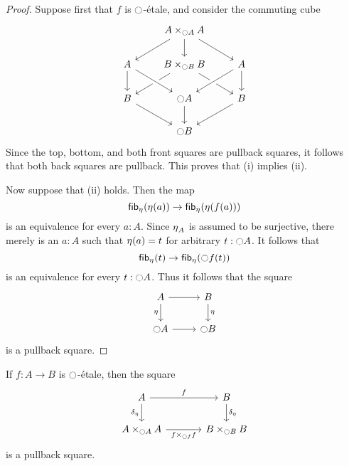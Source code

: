 \documentclass[9pt,twosided]{amsart}
\begin{document}
\begin{proof}
Suppose first that $f$ is ${\ocircle}$-\'etale, and consider the commuting cube
\begin{equation*}
\begin{tikzcd}
& A\times_{\modal A} A \arrow[dl] \arrow[d] \arrow[dr] \\
A \arrow[d] & B\times_{\modal B} B \arrow[dl] \arrow[dr] & A \arrow[dl,crossing over] \arrow[d] \\
B \arrow[dr] & \modal A \arrow[from=ul,crossing over] \arrow[d] & B \arrow[dl] \\
& \modal B
\end{tikzcd}
\end{equation*}
Since the top, bottom, and both front squares are pullback squares, it follows that both back squares are pullback. This proves that (i) implies (ii).

Now suppose that (ii) holds. Then the map
\begin{equation*}
\fib{\modalunit}{\modalunit(a)}\to \fib{\modalunit}{\modalunit(f(a))}
\end{equation*}
is an equivalence for every $a:A$. Since ${\eta_{}}_A$ is assumed to be surjective, there merely is an $a:A$ such that ${\eta_{}}(a)=t$ for arbitrary $t:{\ocircle} A$.
It follows that
\begin{equation*}
\fib{\modalunit}{t}\to \fib{\modalunit}{\modal f(t)}
\end{equation*}
is an equivalence for every $t:{\ocircle} A$. Thus it follows that the square
\begin{equation*}
\begin{tikzcd}
A \arrow[d,swap,"\modalunit"] \arrow[r] & B \arrow[d,"\modalunit"] \\
\modal A \arrow[r] & \modal B
\end{tikzcd}
\end{equation*}
is a pullback square.
\end{proof}

\begin{cor}
If $f:A\to B$ is ${\ocircle}$-\'etale, then the square
\begin{equation*}
\begin{tikzcd}[column sep=large]
A \arrow[d,swap,"\delta_{\modalunit}"] \arrow[r,"f"] & B \arrow[d,"\delta_{\modalunit}"] \\
A\times_{\modal A} A \arrow[r,swap,"f\times_{\modal f}f"] & B\times_{\modal B} B
\end{tikzcd}
\end{equation*}
is a pullback square.
\end{cor}
\end{document}

